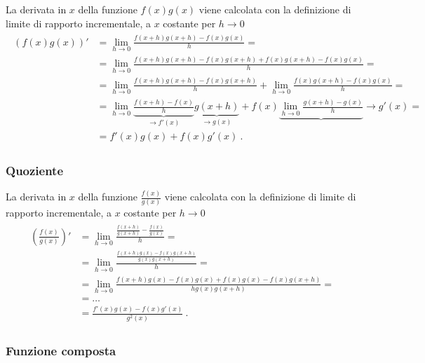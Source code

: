 \documentclass[letterpaper,10pt,italian]{jupyterBook}
\begin{document}
\sphinxAtStartPar
La derivata in \(x\) della funzione \(f(x) g(x)\) viene calcolata con la definizione di limite di rapporto incrementale, a \(x\) costante per \(h \rightarrow 0\)
\begin{equation*}
\begin{split}\begin{aligned}
  \left( f(x) g(x) \right)' 
  & = \lim_{h \rightarrow 0} \frac{f(x+h) g(x+h) - f(x) g(x)}{h} = \\
  & = \lim_{h \rightarrow 0} \frac{f(x+h) g(x+h) - f(x)g(x+h) + f(x)g(x+h) - f(x) g(x)}{h} = \\
  & = \lim_{h \rightarrow 0} \frac{f(x+h) g(x+h) - f(x)g(x+h)}{h} + \lim_{h\rightarrow 0} \frac{f(x)g(x+h) - f(x) g(x)}{h} = \\
  & = \lim_{h \rightarrow 0} \underbrace{\frac{f(x+h) - f(x)}{h}}_{\rightarrow f'(x)} \underbrace{g(x+h)}_{\rightarrow g(x)} + f(x) \underbrace{\lim_{h\rightarrow 0} \frac{g(x+h) - g(x)}{h}}{\rightarrow g'(x)} = \\
  & = f'(x) g(x) + f(x) g'(x) \ .
\end{aligned}\end{split}
\end{equation*}\subsubsection*{Quoziente}

\sphinxAtStartPar
La derivata in \(x\) della funzione \(\frac{f(x)}{g(x)}\) viene calcolata con la definizione di limite di rapporto incrementale, a \(x\) costante per \(h \rightarrow 0\)
\begin{equation*}
\begin{split}\begin{aligned}
  \left( \frac{f(x)}{ g(x)} \right)' 
  & = \lim_{h \rightarrow 0} \frac{ \frac{f(x+h)}{g(x+h)} - \frac{f(x)}{g(x)}}{h} = \\
  & = \lim_{h \rightarrow 0} \frac{\frac{f(x+h) g(x) - f(x) g(x+h)}{g(x) g(x+h)}}{h} = \\
  & = \lim_{h \rightarrow 0} \frac{f(x+h) g(x) - f(x) g(x) + f(x) g(x) - f(x) g(x+h)}{h g(x) g(x+h)} = \\
  & = \dots \\
  & = \frac{f'(x) g(x) - f(x) g'(x)}{g^2(x)} \ .
\end{aligned}\end{split}
\end{equation*}\subsubsection*{Funzione composta}
\end{document}
